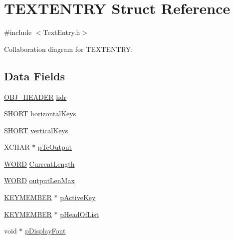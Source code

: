 \hypertarget{struct_t_e_x_t_e_n_t_r_y}{}\section{T\+E\+X\+T\+E\+N\+T\+R\+Y Struct Reference}
\label{struct_t_e_x_t_e_n_t_r_y}


{\ttfamily \#include $<$Text\+Entry.\+h$>$}



Collaboration diagram for T\+E\+X\+T\+E\+N\+T\+R\+Y\+:
\subsection*{Data Fields}
\begin{DoxyCompactItemize}
\item 
\hyperlink{struct_o_b_j___h_e_a_d_e_r}{O\+B\+J\+\_\+\+H\+E\+A\+D\+E\+R} \hyperlink{struct_t_e_x_t_e_n_t_r_y_abeffaf353197a8a64fba6707b68ce0be}{hdr}
\item 
\hyperlink{_generic_type_defs_8h_ae9bb25d3afecf3bfab0fbe3c22c2050f}{S\+H\+O\+R\+T} \hyperlink{struct_t_e_x_t_e_n_t_r_y_a1d38c220eb8760498daefd6b30513814}{horizontal\+Keys}
\item 
\hyperlink{_generic_type_defs_8h_ae9bb25d3afecf3bfab0fbe3c22c2050f}{S\+H\+O\+R\+T} \hyperlink{struct_t_e_x_t_e_n_t_r_y_a60ea442272615cc75a1a467ed2fd719e}{vertical\+Keys}
\item 
X\+C\+H\+A\+R $\ast$ \hyperlink{struct_t_e_x_t_e_n_t_r_y_a30f173ef1b786e180830681035d96353}{p\+Te\+Output}
\item 
\hyperlink{_generic_type_defs_8h_a2b0e863dadf920709ec53d9088ee7c91}{W\+O\+R\+D} \hyperlink{struct_t_e_x_t_e_n_t_r_y_a944ce9bda9c0696403a44df80fcd195a}{Current\+Length}
\item 
\hyperlink{_generic_type_defs_8h_a2b0e863dadf920709ec53d9088ee7c91}{W\+O\+R\+D} \hyperlink{struct_t_e_x_t_e_n_t_r_y_ad2f41f36adf0b99717039b18ec931f93}{output\+Len\+Max}
\item 
\hyperlink{struct_k_e_y_m_e_m_b_e_r}{K\+E\+Y\+M\+E\+M\+B\+E\+R} $\ast$ \hyperlink{struct_t_e_x_t_e_n_t_r_y_a11b0434c8b4d17772c8be0aa4eedf959}{p\+Active\+Key}
\item 
\hyperlink{struct_k_e_y_m_e_m_b_e_r}{K\+E\+Y\+M\+E\+M\+B\+E\+R} $\ast$ \hyperlink{struct_t_e_x_t_e_n_t_r_y_af749b85ee8742a7a2241345f7225e23b}{p\+Head\+Of\+List}
\item 
void $\ast$ \hyperlink{struct_t_e_x_t_e_n_t_r_y_a87f710bb3bb191a9ce77db89060678dc}{p\+Display\+Font}
\end{DoxyCompactItemize}


